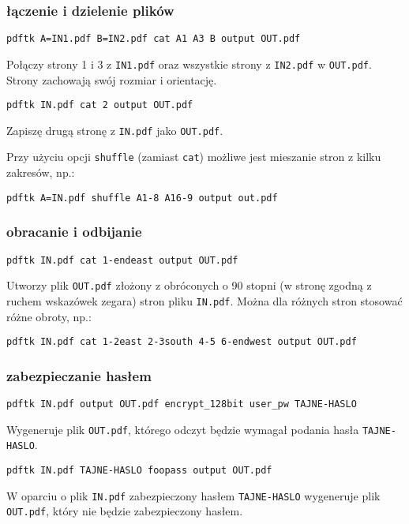 \documentclass[fontSize=10pt, rmargin=3cm, extra]{pdfArticle}
\begin{document}
\subsubsection{łączenie i dzielenie plików}

\begin{verbatim}
pdftk A=IN1.pdf B=IN2.pdf cat A1 A3 B output OUT.pdf
\end{verbatim}
Połączy strony 1 i 3 z \Verb$IN1.pdf$ oraz wszystkie strony z \Verb$IN2.pdf$ w \Verb$OUT.pdf$.
Strony zachowają swój rozmiar i orientację.

\begin{verbatim}
pdftk IN.pdf cat 2 output OUT.pdf
\end{verbatim}
Zapiszę drugą stronę z \Verb$IN.pdf$ jako \Verb$OUT.pdf$.

Przy użyciu opcji \Verb$shuffle$ (zamiast \Verb$cat$) możliwe jest mieszanie stron z kilku zakresów, np.:
\begin{verbatim}
pdftk A=IN.pdf shuffle A1-8 A16-9 output out.pdf
\end{verbatim}

\subsubsection{obracanie i odbijanie}

\begin{verbatim}
pdftk IN.pdf cat 1-endeast output OUT.pdf
\end{verbatim}
Utworzy plik \Verb$OUT.pdf$ złożony z obróconych o 90 stopni (w stronę zgodną z ruchem wskazówek zegara) stron pliku \Verb$IN.pdf$. Można dla różnych stron stosować różne obroty, np.:
\begin{verbatim}
pdftk IN.pdf cat 1-2east 2-3south 4-5 6-endwest output OUT.pdf
\end{verbatim}

\subsubsection{zabezpieczanie hasłem}

\begin{verbatim}
pdftk IN.pdf output OUT.pdf encrypt_128bit user_pw TAJNE-HASLO
\end{verbatim}
Wygeneruje plik \Verb$OUT.pdf$, którego odczyt będzie wymagał podania hasła \Verb$TAJNE-HASLO$.

\begin{verbatim}
pdftk IN.pdf TAJNE-HASLO foopass output OUT.pdf
\end{verbatim}
W oparciu o plik \Verb$IN.pdf$ zabezpieczony hasłem \Verb$TAJNE-HASLO$ wygeneruje plik \Verb$OUT.pdf$, który nie będzie zabezpieczony hasłem.
\end{document}
